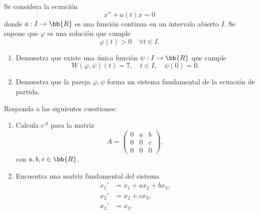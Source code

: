 \documentclass[12pt]{article}
\begin{document}
\begin{ejercicio}
    Se considera la ecuación
    \begin{equation*}
        x''+a(t)x=0
    \end{equation*}
    donde $a:I\to\bb{R}$ es una función continua en un intervalo abierto $I$. Se supone que $\varphi$ es una solución que cumple
    \begin{equation*}
        \varphi(t)>0\quad\forall t\in I.
    \end{equation*}
    \begin{enumerate}
        \item Demuestra que existe una única función $\psi:I\to\bb{R}$ que cumple
        \begin{equation*}
            W(\varphi,\psi)(t)=7,\quad t\in I,\quad \psi(0)=0.
        \end{equation*}
        \item Demuestra que la pareja $\varphi,\psi$ forma un sistema fundamental de la ecuación de partida.
    \end{enumerate}
\end{ejercicio}

\begin{ejercicio}
    Responda a las siguientes cuestiones:
    \begin{enumerate}
        \item Calcula $e^A$ para la matriz
        \begin{equation*}
            A=\begin{pmatrix}
                0 & a & b\\
                0 & 0 & c\\
                0 & 0 & 0
            \end{pmatrix},
        \end{equation*}
        con $a,b,c\in\bb{R}$.
        \item Encuentra una matriz fundamental del sistema
        \begin{align*}
            x_1'&=x_1+ax_2+bx_3,\\
            x_2'&=x_2+cx_3,\\
            x_3'&=x_3.
        \end{align*}
    \end{enumerate}
\end{ejercicio}
    
\end{document}
